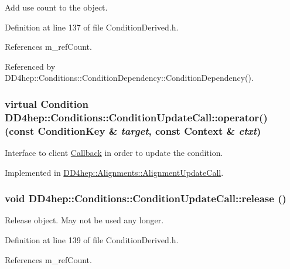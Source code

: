 Add use count to the object. 

Definition at line 137 of file ConditionDerived.h.

References m\_\-refCount.

Referenced by DD4hep::Conditions::ConditionDependency::ConditionDependency().\hypertarget{class_d_d4hep_1_1_conditions_1_1_condition_update_call_adc561aca8c6bf851e0ee53f719b26a44}{
\subsubsection[{operator()}]{\setlength{\rightskip}{0pt plus 5cm}virtual {\bf Condition} DD4hep::Conditions::ConditionUpdateCall::operator() (const {\bf ConditionKey} \& {\em target}, \/  const {\bf Context} \& {\em ctxt})}}
\label{class_d_d4hep_1_1_conditions_1_1_condition_update_call_adc561aca8c6bf851e0ee53f719b26a44}


Interface to client \hyperlink{class_d_d4hep_1_1_callback}{Callback} in order to update the condition. 

Implemented in \hyperlink{class_d_d4hep_1_1_alignments_1_1_alignment_update_call_a1180d2f8d62c0607b86c87853c7eeeb5}{DD4hep::Alignments::AlignmentUpdateCall}.\hypertarget{class_d_d4hep_1_1_conditions_1_1_condition_update_call_a6009b30c5c1d14c3c489c84d2042f4fe}{
\subsubsection[{release}]{\setlength{\rightskip}{0pt plus 5cm}void DD4hep::Conditions::ConditionUpdateCall::release ()}}
\label{class_d_d4hep_1_1_conditions_1_1_condition_update_call_a6009b30c5c1d14c3c489c84d2042f4fe}


Release object. May not be used any longer. 

Definition at line 139 of file ConditionDerived.h.

References m\_\-refCount.

